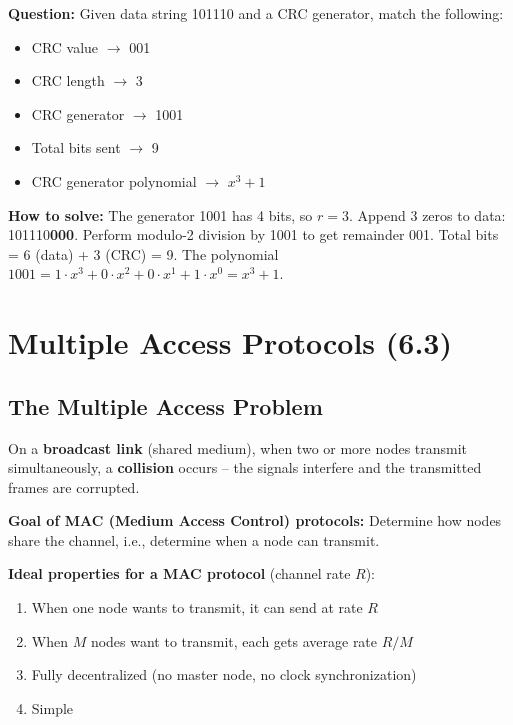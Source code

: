 \begin{exambox}
\textbf{Question:} Given data string 101110 and a CRC generator, match the following:
\begin{itemize}[noitemsep]
    \item CRC value $\rightarrow$ 001
    \item CRC length $\rightarrow$ 3
    \item CRC generator $\rightarrow$ 1001
    \item Total bits sent $\rightarrow$ 9
    \item CRC generator polynomial $\rightarrow$ $x^3 + 1$
\end{itemize}

\textbf{How to solve:} The generator 1001 has 4 bits, so $r = 3$. Append 3 zeros to data: 101110\textbf{000}. Perform modulo-2 division by 1001 to get remainder 001. Total bits = 6 (data) + 3 (CRC) = 9. The polynomial $1001 = 1\cdot x^3 + 0\cdot x^2 + 0\cdot x^1 + 1\cdot x^0 = x^3 + 1$.
\end{exambox}

\section{Multiple Access Protocols (6.3)}

\subsection{The Multiple Access Problem}

\begin{keybox}
On a \textbf{broadcast link} (shared medium), when two or more nodes transmit simultaneously, a \textbf{collision} occurs -- the signals interfere and the transmitted frames are corrupted.

\textbf{Goal of MAC (Medium Access Control) protocols:} Determine how nodes share the channel, i.e., determine when a node can transmit.

\medskip
\textbf{Ideal properties for a MAC protocol} (channel rate $R$):
\begin{enumerate}[noitemsep]
    \item When one node wants to transmit, it can send at rate $R$
    \item When $M$ nodes want to transmit, each gets average rate $R/M$
    \item Fully decentralized (no master node, no clock synchronization)
    \item Simple
\end{enumerate}
\end{keybox}

